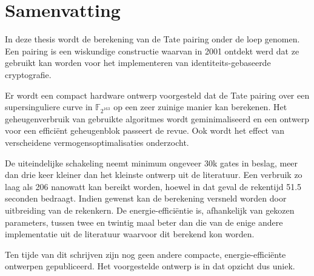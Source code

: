 \chapter*{Samenvatting}

In deze thesis wordt de berekening van de Tate pairing onder de loep genomen. Een pairing is een wiskundige constructie waarvan in 2001 ontdekt werd dat ze gebruikt kan worden voor het implementeren van identiteits-gebaseerde cryptografie.

Er wordt een compact hardware ontwerp voorgesteld dat de Tate pairing over een supersinguliere curve in $\mathbb{F}_{2^{163}}$ op een zeer zuinige manier kan berekenen. Het geheugenverbruik van gebruikte algoritmes wordt geminimaliseerd en een ontwerp voor een effici\"ent geheugenblok passeert de revue. Ook wordt het effect van verscheidene vermogensoptimalisaties onderzocht.

De uiteindelijke schakeling neemt minimum ongeveer 30k gates in beslag, meer dan drie keer kleiner dan het kleinste ontwerp uit de literatuur. Een verbruik zo laag als 206 nanowatt kan bereikt worden, hoewel in dat geval de rekentijd 51.5 seconden bedraagt. Indien gewenst kan de berekening versneld worden door uitbreiding van de rekenkern. De energie-effici\"entie is, afhankelijk van gekozen parameters, tussen twee en twintig maal beter dan die van de enige andere implementatie uit de literatuur waarvoor dit berekend kon worden.

Ten tijde van dit schrijven zijn nog geen andere compacte, energie-effici\"ente ontwerpen gepubliceerd. Het voorgestelde ontwerp is in dat opzicht dus uniek.
